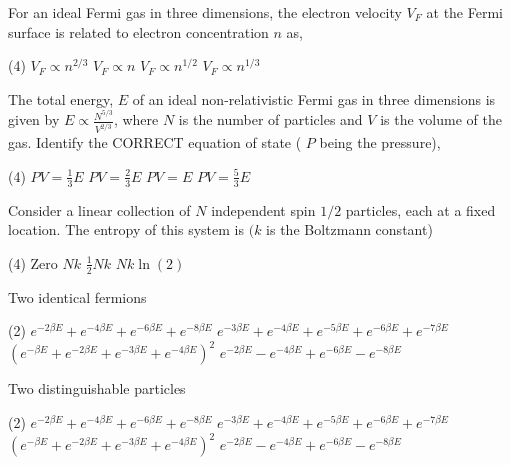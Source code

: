 \begin{enumerate}
	\item For an ideal Fermi gas in three dimensions, the electron velocity $V_{F}$ at the Fermi surface is related to electron concentration $n$ as,
	{}
	
	\begin{tasks}(4)
		\task[\textbf{A.}] $V_{F} \propto n^{2 / 3}$
		\task[\textbf{B.}]  $V_{F} \propto n$
		\task[\textbf{C.}] $V_{F} \propto n^{1 / 2}$
		\task[\textbf{D.}] $V_{F} \propto n^{1 / 3}$
	\end{tasks}
	
	\item The total energy, $E$ of an ideal non-relativistic Fermi gas in three dimensions is given by $E \propto \frac{N^{5 / 3}}{V^{2 / 3}}$, where $N$ is the number of particles and $V$ is the volume of the gas. Identify the CORRECT equation of state ( $P$ being the pressure),
	{}
	\begin{tasks}(4)
		\task[\textbf{A.}] $P V=\frac{1}{3} E$
		\task[\textbf{B.}] $P V=\frac{2}{3} E$
		\task[\textbf{C.}] $P V=E$
		\task[\textbf{D.}] $P V=\frac{5}{3} E$
	\end{tasks}
	
	\item Consider a linear collection of $N$ independent spin $1 / 2$ particles, each at a fixed location. The entropy of this system is $(k$ is the Boltzmann constant)
	{}
	\begin{tasks}(4)
		\task[\textbf{A.}] Zero
		\task[\textbf{B.}]  $N k$
		\task[\textbf{C.}]  $\frac{1}{2} N k$
		\task[\textbf{D.}] $N k \ln (2)$
	\end{tasks}
	
	\item Two identical fermions
	{}
	\begin{tasks}(2)
		\task[\textbf{A.}] $e^{-2 \beta E}+e^{-4 \beta E}+e^{-6 \beta E}+e^{-8 \beta E}$
		\task[\textbf{B.}] $e^{-3 \beta E}+e^{-4 \beta E}+e^{-5 \beta E}+e^{-6 \beta E}+e^{-7 \beta E}$
		\task[\textbf{C.}] $\left(e^{-\beta E}+e^{-2 \beta E}+e^{-3 \beta E}+e^{-4 \beta E}\right)^{2}$
		\task[\textbf{D.}] $e^{-2 \beta E}-e^{-4 \beta E}+e^{-6 \beta E}-e^{-8 \beta E}$
	\end{tasks}

	\begin{minipage}{\textwidth}
		\item Two distinguishable particles
		{}
	\end{minipage}
	\begin{tasks}(2)
		\task[\textbf{A.}] $e^{-2 \beta E}+e^{-4 \beta E}+e^{-6 \beta E}+e^{-8 \beta E}$
		\task[\textbf{B.}] $e^{-3 \beta E}+e^{-4 \beta E}+e^{-5 \beta E}+e^{-6 \beta E}+e^{-7 \beta E}$
		\task[\textbf{C.}] $\left(e^{-\beta E}+e^{-2 \beta E}+e^{-3 \beta E}+e^{-4 \beta E}\right)^{2}$
		\task[\textbf{D.}] $e^{-2 \beta E}-e^{-4 \beta E}+e^{-6 \beta E}-e^{-8 \beta E}$
	\end{tasks}


\end{enumerate}
